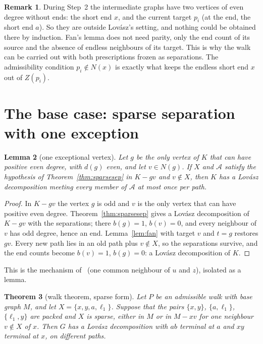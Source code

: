 \documentclass[11pt]{amsart}
\newtheorem{theorem}{Theorem}[section]
\newtheorem{lemma}[theorem]{Lemma}
\theoremstyle{definition}
\newtheorem{remark}[theorem]{Remark}
\newcommand{\lean}[1]{\quad{\footnotesize[Lean: \texttt{#1}]}}
\begin{document}
\begin{remark}
During Step~2 the intermediate graphs have two vertices of even degree without ends: the short
end $x$, and the current target $p_i$ (at the end, the short end $a$). So they are outside
Lov\'asz's setting, and nothing could be obtained there by induction. Fan's lemma does not need
parity, only the end count of its source and the absence of endless neighbours of its target.
This is why the walk can be carried out with both prescriptions frozen as separations. The
admissibility condition $p_i\notin N(x)$ is exactly what keeps the endless short end $x$ out of
$Z(p_i)$.
\end{remark}

\section{The base case: sparse separation with one exception}\label{sec:sparse}

\begin{lemma}[one exceptional vertex]\label{lem:fix}
Let $g$ be the only vertex of $K$ that can have positive even degree, with $d(g)$ even, and let
$v\in N(g)$. If $X$ and $\mathcal A$ satisfy the hypothesis of Theorem~\ref{thm:sparsesep} in
$K-gv$ and $v\notin X$, then $K$ has a Lov\'asz decomposition meeting every member of $\mathcal
A$ at most once per path.\lean{sep\_sparse\_fix}
\end{lemma}

\begin{proof}
In $K-gv$ the vertex $g$ is odd and $v$ is the only vertex that can have positive even degree.
Theorem~\ref{thm:sparsesep} gives a Lov\'asz decomposition of $K-gv$ with the separations; there
$b(g)=1$, $b(v)=0$, and every neighbour of $v$ has odd degree, hence an end. Lemma~\ref{lem:fan}
with target $v$ and $t=g$ restores $gv$. Every new path lies in an old path plus $v\notin X$, so
the separations survive, and the end counts become $b(v)=1$, $b(g)=0$: a Lov\'asz decomposition of
$K$.
\end{proof}

This is the mechanism of~\cite[Theorem~5.1]{PE} (one common neighbour of $u$ and $z$), isolated
as a lemma.

\begin{theorem}[walk theorem, sparse form]\label{thm:sparse}
Let $P$ be an admissible walk with base graph $M$, and let $X=\{x,y,a,\ell_1\}$. Suppose that the
pairs $\{x,y\}$, $\{a,\ell_1\}$, $\{\ell_1,y\}$ are packed and $X$ is sparse, either in $M$ or in
$M-xv$ for one neighbour $v\notin X$ of $x$. Then $G$ has a Lov\'asz decomposition with $ab$
terminal at $a$ and $xy$ terminal at $x$, on different paths.\lean{ptm2\_of\_sparse}
\end{theorem}
\end{document}
